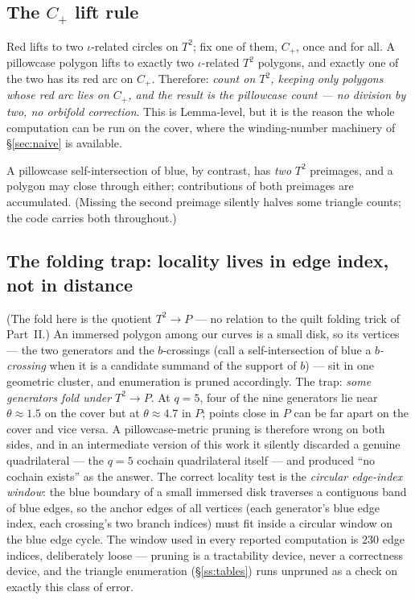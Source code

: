 \documentclass[11pt,reqno]{amsart}
\theoremstyle{plain}
\theoremstyle{definition}
\newcommand{\pill}{P}
\newcommand{\bc}{b}
\begin{document}
\subsection{The $C_+$ lift rule}\label{ss:cplus}
Red lifts to two $\iota$-related circles on $T^2$; fix one of them, $C_+$, once and for all.
A pillowcase polygon lifts to exactly two $\iota$-related $T^2$ polygons, and exactly one of
the two has its red arc on $C_+$. Therefore: \emph{count on $T^2$, keeping only polygons whose
red arc lies on $C_+$, and the result is the pillowcase count --- no division by two, no
orbifold correction}. This is Lemma-level, but it is the reason the whole computation can be run
on the cover, where the winding-number machinery of \S\ref{sec:naive} is available.

A pillowcase self-intersection of blue, by contrast, has \emph{two} $T^2$ preimages, and a
polygon may close through either; contributions of both preimages are accumulated. (Missing
the second preimage silently halves some triangle counts; the code carries both throughout.)

\subsection{The folding trap: locality lives in edge index, not in distance}\label{ss:folding}
(The fold here is the quotient $T^2\to\pill$ --- no relation to the quilt folding trick of
Part~II.) An immersed polygon among our curves is a small disk, so its vertices --- the two
generators and the $\bc$-crossings (call a self-intersection of blue a \emph{$\bc$-crossing}
when it is a candidate summand of the support of $\bc$) --- sit in one geometric cluster, and
enumeration is pruned accordingly. The trap: \emph{some generators fold under $T^2\to\pill$}. At $q=5$, four of the
nine generators lie near $\theta\approx1.5$ on the cover but at $\theta\approx4.7$ in $\pill$;
points close in $\pill$ can be far apart on the cover and vice versa. A pillowcase-metric
pruning is therefore wrong on both sides, and in an intermediate version of this work it
silently discarded a genuine quadrilateral --- the $q=5$ cochain quadrilateral itself --- and
produced ``no cochain exists'' as the answer. The correct locality test is the
\emph{circular edge-index window}: the blue boundary of a small immersed disk traverses a
contiguous band of blue edges, so the anchor edges of all vertices (each generator's blue edge
index, each crossing's two branch indices) must fit inside a circular window on the blue edge
cycle. The window used in every reported computation is $230$ edge indices, deliberately loose --- pruning is a
tractability device, never a correctness device, and the triangle enumeration
(\S\ref{ss:tables}) runs unpruned as a check on exactly this class of error.
\end{document}
